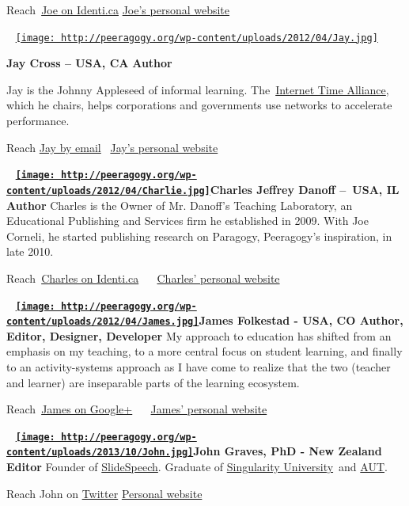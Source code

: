 Reach~\href{http://identi.ca/arided}{Joe on Identi.ca} \textbar{}
\href{http://metameso.org/~joe\%20}{Joe's personal website}

~
\href{http://peeragogy.org/resources/meet-the-team/jay/}{\texttt{[image: http://peeragogy.org/wp-content/uploads/2012/04/Jay.jpg]}}

\textbf{Jay Cross -- USA, CA} \textbf{Author}

Jay is the Johnny Appleseed of informal learning.
The~\href{http://internettimealliance.com/}{Internet Time Alliance},
which he chairs, helps corporations and governments use networks to
accelerate performance.

Reach \href{mailto:jaycross@internettime.com}{Jay by email}~\textbar{}
\href{http://jaycross.com}{Jay's personal website}

~
\textbf{\href{http://peeragogy.org/wp-content/uploads/2012/04/Charlie.jpg}{\texttt{[image: http://peeragogy.org/wp-content/uploads/2012/04/Charlie.jpg]}}Charles
Jeffrey Danoff --~USA, IL} \textbf{Author} Charles is the Owner of Mr.
Danoff's Teaching Laboratory, an Educational Publishing and Services
firm he established in 2009. With Joe Corneli, he started publishing
research on Paragogy, Peeragogy's inspiration, in late 2010.

Reach~\href{http://identi.ca/mrd}{Charles on Identi.ca} ~\textbar{}
~\href{http://mr.danoff.org}{Charles' personal website}

~
\textbf{\href{http://peeragogy.org/wp-content/uploads/2012/04/James.jpg}{\texttt{[image: http://peeragogy.org/wp-content/uploads/2012/04/James.jpg]}}James
Folkestad - USA, CO Author, Editor, Designer, Developer} My approach to
education has shifted from an emphasis on my teaching, to a more central
focus on student learning, and finally to an activity-systems approach
as I have come to realize that the two (teacher and learner) are
inseparable parts of the learning ecosystem.

Reach~\href{https://plus.google.com/u/0/114552232610071440407/about}{James
on Google+} ~\textbar{} ~\href{http://edgility.net}{James' personal
website}

~
\textbf{\href{http://peeragogy.org/wp-content/uploads/2013/10/John.jpg}{\texttt{[image: http://peeragogy.org/wp-content/uploads/2013/10/John.jpg]}}John
Graves, PhD - New Zealand Editor} Founder of
\href{http://slidespeech.com}{SlideSpeech}. Graduate of
\href{http://singularityu.org}{Singularity University}~and
\href{http://www.aut.ac.nz/}{AUT}.

Reach John on \href{http://twitter.com/slidespeech}{Twitter} \textbar{}
\href{http://slidespeech.tumblr.com}{Personal website}

